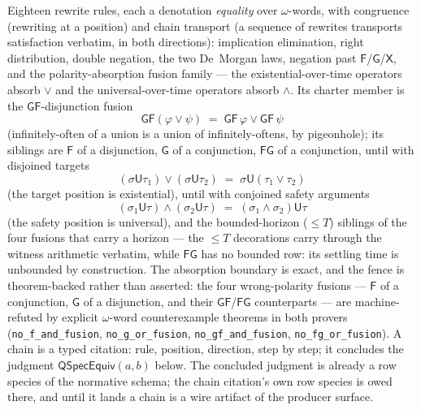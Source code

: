Eighteen rewrite rules, each a denotation \emph{equality} over
$\omega$-words, with congruence (rewriting at a position) and chain
transport (a sequence of rewrites transports satisfaction verbatim,
in both directions): implication elimination, right distribution,
double negation, the two De~Morgan laws, negation past
$\mathsf{F}$/$\mathsf{G}$/$\mathsf{X}$, and the polarity-absorption
fusion family --- the existential-over-time operators absorb $\vee$
and the universal-over-time operators absorb $\wedge$. Its charter
member is the $\mathsf{GF}$-disjunction fusion
\[
\mathsf{GF}(\varphi \vee \psi) \;=\;
\mathsf{GF}\,\varphi \vee \mathsf{GF}\,\psi
\]
(infinitely-often of a union is a union of infinitely-oftens, by
pigeonhole); its siblings are $\mathsf{F}$ of a disjunction,
$\mathsf{G}$ of a conjunction, $\mathsf{FG}$ of a conjunction, until
with disjoined targets
\[
(\sigma \mathbin{\mathsf{U}} \tau_1) \vee
(\sigma \mathbin{\mathsf{U}} \tau_2) \;=\;
\sigma \mathbin{\mathsf{U}} (\tau_1 \vee \tau_2)
\]
(the target position is existential), until with conjoined safety
arguments
\[
(\sigma_1 \mathbin{\mathsf{U}} \tau) \wedge
(\sigma_2 \mathbin{\mathsf{U}} \tau) \;=\;
(\sigma_1 \wedge \sigma_2) \mathbin{\mathsf{U}} \tau
\]
(the safety position is universal), and the bounded-horizon
($\le T$) siblings of the four fusions that carry a horizon --- the
$\le T$ decorations carry through the witness arithmetic verbatim, while
$\mathsf{FG}$ has no bounded row: its settling time is unbounded by
construction. The absorption boundary is exact, and the fence is
theorem-backed rather than asserted: the four wrong-polarity fusions
--- $\mathsf{F}$ of a conjunction, $\mathsf{G}$ of a disjunction,
and their $\mathsf{GF}$/$\mathsf{FG}$ counterparts --- are
machine-refuted by explicit $\omega$-word counterexample theorems in
both provers (\texttt{no\_f\_and\_fusion}, \texttt{no\_g\_or\_fusion},
\texttt{no\_gf\_and\_fusion}, \texttt{no\_fg\_or\_fusion}). A chain
is a typed citation: rule, position, direction, step by step; it
concludes the judgment $\mathsf{QSpecEquiv}(a, b)$ below. The
concluded judgment is already a row species of the normative
schema; the chain citation's own row species is owed there, and
until it lands a chain is a wire artifact of the producer surface.


